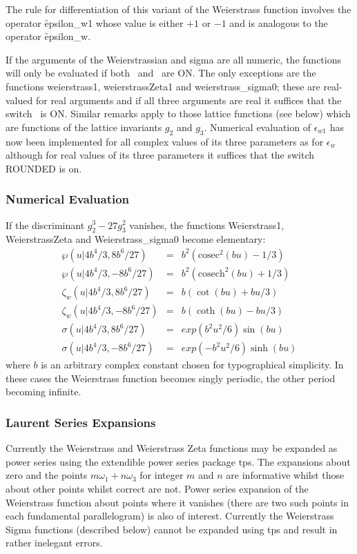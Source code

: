 The rule for differentiation of this variant of the Weierstrass function
involves the operator \f{epsilon\_w1} whose value is either $+1$ or $-1$
and is analogous to the operator \f{epsilon\_w}.

If the arguments of the Weierstrassian and sigma are all numeric, the functions
will only be evaluated if both \ and \ are ON.
The only exceptions are the functions weierstrass1, weierstrassZeta1 and
weierstrass\_sigma0; these are real-valued for real arguments and if all three
arguments are real it suffices that the switch \ is ON. Similar
remarks apply to those lattice functions (see below) which are functions of
the lattice invariants $g_2$ and $g_3$.
Numerical evaluation of $\epsilon_{w1}$ has now been implemented for all complex
values of its three parameters as for $\epsilon_{w}$ although for real values of
its three parameters it suffices that the switch ROUNDED is on.

\subsubsection{Numerical Evaluation}
If the discriminant $g_2^3-27g_3^2$ vanishes, the functions
Weierstrass1, WeierstrassZeta and Weierstrass\_sigma0 become elementary:
\begin{eqnarray*}
\wp(u | 4b^4/3, 8b^6/27) &=& b^2(\mathrm{cosec}^2(b u)-1/3)\\
\wp(u | 4b^4/3, -8b^6/27) &=& b^2(\mathrm{cosech}^2(b u)+1/3)\\
\zeta_w(u |4b^4/3, 8b^6/27) &=& b(\cot(b u)+bu/3)\\
\zeta_w(u |4b^4/3, -8b^6/27) &=& b(\coth(b u)-bu/3)\\
\sigma(u |4b^4/3, 8b^6/27) &=& exp(b^2u^2/6)\sin(bu) \\
\sigma(u |4b^4/3, -8b^6/27) &=& exp(-b^2u^2/6)\sinh(bu)
\end{eqnarray*}
where $b$ is an arbitrary complex constant chosen for typographical simplicity.
In these cases the Weierstrass function becomes singly periodic, the other
period becoming infinite.

\subsubsection{Laurent Series Expansions}
Currently the Weierstrass and Weierstrass Zeta functions may be expanded as
power series using the extendible power series package tps.  The expansions
about zero and the points $m\omega_1+n\omega_3$ for integer $m$ and $n$ are
informative whilst those about other points whilst correct are not. Power series
expansion of the Weierstrass function about points where it vanishes (there are
two such points in each fundamental parallelogram) is also of interest. Currently
the Weierstrass Sigma functions (described below) cannot be expanded using tps
and result in rather inelegant errors.

